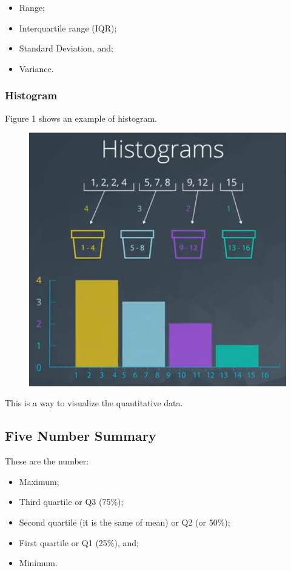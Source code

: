 \documentclass[]{book}
\providecommand{\tightlist}{%
  \setlength{\itemsep}{0pt}\setlength{\parskip}{0pt}}
\begin{document}
\begin{itemize}
\tightlist
\item
  Range;
\item
  Interquartile range (IQR);
\item
  Standard Deviation, and;
\item
  Variance.
\end{itemize}

\subsubsection{Histogram}\label{histogram}

Figure 1 shows an example of histogram.

\begin{figure}
\centering
\includegraphics{01-img/c4_l2_01.png}
\caption{}
\end{figure}

This is a way to visualize the quantitative data.

\subsection{Five Number Summary}\label{five-number-summary}

These are the number:

\begin{itemize}
\tightlist
\item
  Maximum;
\item
  Third quartile or Q3 (75\%);
\item
  Second quartile (it is the same of mean) or Q2 (or 50\%);
\item
  First quartile or Q1 (25\%), and;
\item
  Minimum.
\end{itemize}
\end{document}

